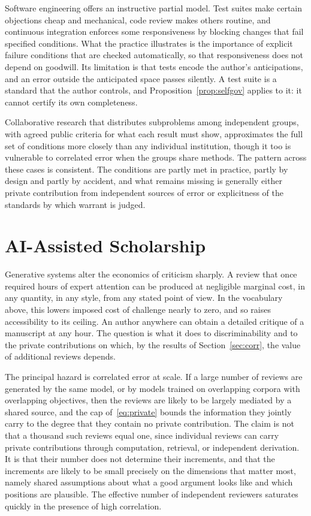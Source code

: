 \documentclass[11pt]{article}
\theoremstyle{remark}
\begin{document}
Software engineering offers an instructive partial model. Test suites make certain objections cheap and mechanical, code review makes others routine, and continuous integration enforces some responsiveness by blocking changes that fail specified conditions. What the practice illustrates is the importance of explicit failure conditions that are checked automatically, so that responsiveness does not depend on goodwill. Its limitation is that tests encode the author's anticipations, and an error outside the anticipated space passes silently. A test suite is a standard that the author controls, and Proposition~\ref{prop:selfgov} applies to it: it cannot certify its own completeness.

Collaborative research that distributes subproblems among independent groups, with agreed public criteria for what each result must show, approximates the full set of conditions more closely than any individual institution, though it too is vulnerable to correlated error when the groups share methods. The pattern across these cases is consistent. The conditions are partly met in practice, partly by design and partly by accident, and what remains missing is generally either private contribution from independent sources of error or explicitness of the standards by which warrant is judged.

\section{AI-Assisted Scholarship}
\label{sec:ai}

Generative systems alter the economics of criticism sharply. A review that once required hours of expert attention can be produced at negligible marginal cost, in any quantity, in any style, from any stated point of view. In the vocabulary above, this lowers imposed cost of challenge nearly to zero, and so raises accessibility to its ceiling. An author anywhere can obtain a detailed critique of a manuscript at any hour. The question is what it does to discriminability and to the private contributions on which, by the results of Section~\ref{sec:corr}, the value of additional reviews depends.

The principal hazard is correlated error at scale. If a large number of reviews are generated by the same model, or by models trained on overlapping corpora with overlapping objectives, then the reviews are likely to be largely mediated by a shared source, and the cap of~\eqref{eq:private} bounds the information they jointly carry to the degree that they contain no private contribution. The claim is not that a thousand such reviews equal one, since individual reviews can carry private contributions through computation, retrieval, or independent derivation. It is that their number does not determine their increments, and that the increments are likely to be small precisely on the dimensions that matter most, namely shared assumptions about what a good argument looks like and which positions are plausible. The effective number of independent reviewers saturates quickly in the presence of high correlation.
\end{document}

